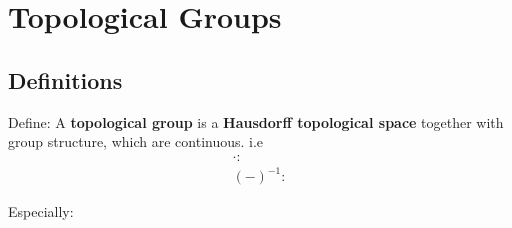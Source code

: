 \documentclass[Total.tex]{subfiles}
\begin{document}
	\chapter{Topological Groups}
		\section{Definitions}
			\begin{Def}
				Define: A \textbf{topological group} is a \textbf{Hausdorff topological space} together with group structure, which are continuous. i.e
				\begin{gather*}
					\cdot:\\
					(-)^{-1}:
				\end{gather*}
			\end{Def}
			
			Especially:
			\begin{Def}
				
			\end{Def}
	
\end{document}
